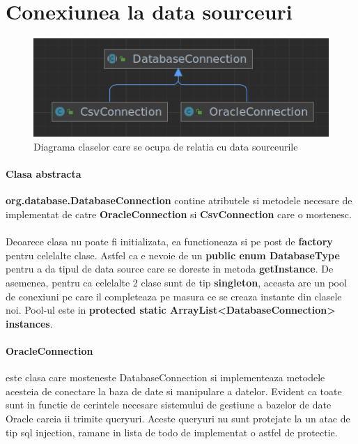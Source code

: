 \documentclass[oneside]{article}
\begin{document}
\section[Conexiunea la data sourceuri]{Conexiunea la data sourceuri}

\begin{figure}[ht]
    \centering
    \noindent\includegraphics[scale=0.7]{diagramadb.png}
    \caption{Diagrama claselor care se ocupa de relatia cu data sourceurile}
    \label{fig:diagramadb}
\end{figure}


\paragraph{Clasa abstracta} \textbf{org.database.DatabaseConnection} contine atributele si metodele necesare de implementat de catre \textbf{OracleConnection} si \textbf{CsvConnection} care o mostenesc. 

\paragraph{} Deoarece clasa nu poate fi initializata, ea functioneaza si pe post de \textbf{factory} pentru celelalte clase. Astfel ca e nevoie de un \textbf{public enum DatabaseType} pentru a da tipul de data source care se doreste in metoda \textbf{getInstance}. De asemenea, pentru ca celelalte 2 clase sunt de tip \textbf{singleton}, aceasta are un pool de conexiuni pe care il completeaza pe masura ce se creaza instante din clasele noi. Pool-ul este in \textbf{protected static ArrayList<DatabaseConnection> instances}.

\paragraph{OracleConnection} este clasa care mosteneste DatabaseConnection si implementeaza metodele acesteia de conectare la baza de date si manipulare a datelor. Evident ca toate sunt in functie de cerintele necesare sistemului de gestiune a bazelor de date Oracle careia ii trimite queryuri. Aceste queryuri nu sunt protejate la un atac de tip sql injection, ramane in lista de todo de implementat o astfel de protectie.
\end{document}
